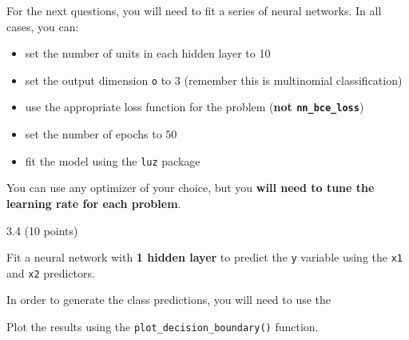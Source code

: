 \documentclass[
  letterpaper,
  DIV=11,
  numbers=noendperiod]{scrartcl}
\providecommand{\tightlist}{%
  \setlength{\itemsep}{0pt}\setlength{\parskip}{0pt}}\usepackage{longtable,booktabs,array}
\begin{document}
\begin{tcolorbox}[enhanced jigsaw, bottomtitle=1mm, rightrule=.15mm, left=2mm, colback=white, opacityback=0, bottomrule=.15mm, titlerule=0mm, toprule=.15mm, colframe=quarto-callout-warning-color-frame, arc=.35mm, colbacktitle=quarto-callout-warning-color!10!white, breakable, leftrule=.75mm, coltitle=black, title=\textcolor{quarto-callout-warning-color}{\faExclamationTriangle}\hspace{0.5em}{Instructions}, opacitybacktitle=0.6, toptitle=1mm]

For the next questions, you will need to fit a series of neural
networks. In all cases, you can:

\begin{itemize}
\tightlist
\item
  set the number of units in each hidden layer to 10
\item
  set the output dimension \texttt{o} to 3 (remember this is multinomial
  classification)
\item
  use the appropriate loss function for the problem (\textbf{not
  \texttt{nn\_bce\_loss}})
\item
  set the number of epochs to \(50\)
\item
  fit the model using the \texttt{luz} package
\end{itemize}

You can use any optimizer of your choice, but you \textbf{will need to
tune the learning rate for each problem}.

\end{tcolorbox}

3.4 (10 points)

Fit a neural network with \textbf{1 hidden layer} to predict the
\texttt{y} variable using the \texttt{x1} and \texttt{x2} predictors.

In order to generate the class predictions, you will need to use the

Plot the results using the \texttt{plot\_decision\_boundary()} function.
\end{document}
